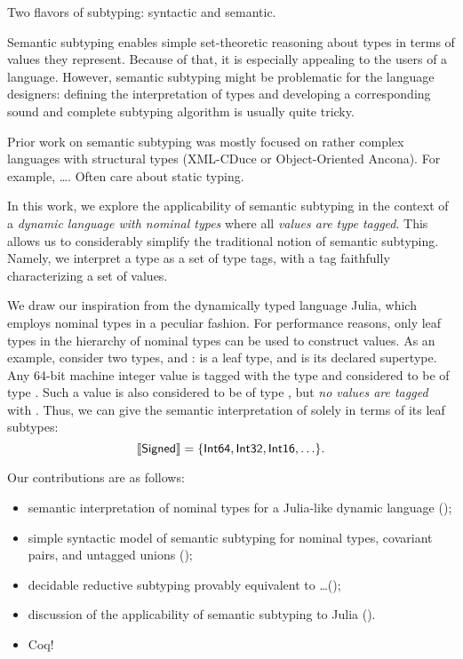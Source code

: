 Two flavors of subtyping: syntactic and semantic. 

Semantic subtyping enables simple set-theoretic reasoning about types
in terms of values they represent.
Because of that, it is especially appealing to the users of a language.
However, semantic subtyping might be problematic for the language designers:
defining the interpretation of types and developing a corresponding
sound and complete subtyping algorithm is usually quite tricky.

Prior work on semantic subtyping was mostly focused on rather complex languages
with structural types (XML-CDuce or Object-Oriented Ancona).
For example, \ldots. Often care about static typing.

In this work, we explore the applicability of semantic subtyping in the context
of a \emph{dynamic language with nominal types} 
where all \emph{values are type tagged}. 
This allows us to considerably simplify the traditional notion 
of semantic subtyping.
Namely, we interpret a type as a set of type tags, 
with a tag faithfully characterizing a set of values.

We draw our inspiration from the dynamically typed language Julia,
which employs nominal types in a peculiar fashion. For performance reasons, 
only leaf types in the hierarchy of nominal types
can be used to construct values.
As an example, consider two types,  and :
 is a leaf type, 
and  is its declared supertype.
Any 64-bit machine integer value is tagged with the type 
and considered to be of type .
Such a value is also considered to be of type ,
but \emph{no values are tagged} with .
Thus, we can give the semantic interpretation of 
solely in terms of its leaf subtypes:
\[
\llbracket \mathsf{Signed} \rrbracket = \{\mathsf{Int64}, \mathsf{Int32}, \mathsf{Int16}, \ldots\}.
\]

Our contributions are as follows:
\begin{itemize}
  \item semantic interpretation of nominal types for a Julia-like 
    dynamic language ();
  \item simple syntactic model of semantic subtyping for nominal types,
    covariant pairs, and untagged unions ();
  \item decidable reductive subtyping provably equivalent to \ldots ();
  \item discussion of the applicability of semantic subtyping to Julia ().
  \item Coq!
\end{itemize}

